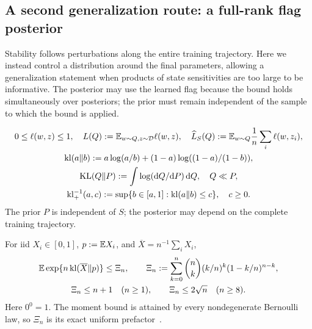 \subsection{A second generalization route: a full-rank flag posterior}
Stability follows perturbations along the entire training trajectory. Here we
instead control a distribution around the final parameters, allowing a
generalization statement when products of state sensitivities are too large
to be informative. The posterior may use the learned flag because the bound
holds simultaneously over posteriors; the prior must remain independent of
the sample to which the bound is applied.

\begin{definition}
\begin{gather}
 0\le\ell(w,z)\le1,\quad
 L(Q):=\mathbb E_{w\sim Q,z\sim\mathcal D}\ell(w,z),\quad
 \widehat L_S(Q):=\mathbb E_{w\sim Q}\frac1n\sum_i\ell(w,z_i),\\
 \operatorname{kl}(a\|b):=a\log(a/b)+(1-a)\log((1-a)/(1-b)),\\
 \operatorname{KL}(Q\|P):=\int\log(\mathrm dQ/\mathrm dP)\,\mathrm dQ,
 \quad Q\ll P,\\
 \operatorname{kl}_+^{-1}(a,c)
 :=\sup\{b\in[a,1]:\operatorname{kl}(a\|b)\le c\},\quad c\ge0.
\end{gather}
The prior $P$ is independent of $S$; the posterior may depend on the complete
training trajectory.
\end{definition}
\begin{lemma}\label{lem:rigid-pac-moment}
For iid $X_i\in[0,1]$, $p:=\mathbb E X_i$, and $\overline X=n^{-1}\sum_iX_i$,
\begin{gather}
 \mathbb E\exp\{n\operatorname{kl}(\overline X\|p)\}\le\Xi_n,\qquad
 \Xi_n:=\sum_{k=0}^n\binom nk(k/n)^k(1-k/n)^{n-k},\\
 \Xi_n\le n+1\quad(n\ge1),\qquad
 \Xi_n\le2\sqrt n\quad(n\ge8).
\end{gather}
Here $0^0=1$. The moment bound is attained by every nondegenerate Bernoulli
law, so $\Xi_n$ is its exact uniform prefactor~\citep{maurer2004note}.
\end{lemma}
